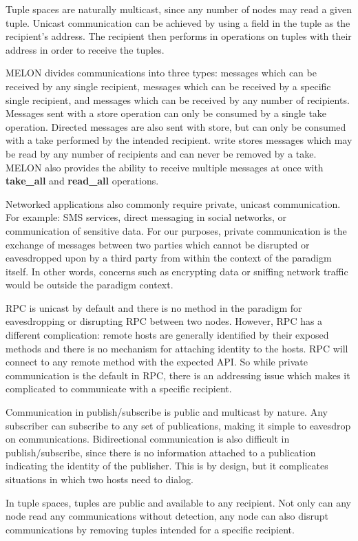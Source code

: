 \documentclass[lnicst]{svmultln}
\begin{document}
Tuple spaces are naturally multicast, since any number of nodes may read a given tuple. Unicast communication can be achieved by using a field in the tuple as the recipient’s address. The recipient then performs in operations on tuples with their address in order to receive the tuples.

MELON divides communications into three types: messages which can be received by any single recipient, messages which can be received by a specific single recipient, and messages which can be received by any number of recipients. Messages sent with a store operation can only be consumed by a single take operation. Directed messages are also sent with store, but can only be consumed with a take performed by the intended recipient. write stores messages which may be read by any number of recipients and can never be removed by a take. MELON also provides the ability to receive multiple messages at once with \textbf{take\_all} and \textbf{read\_all} operations.
    
Networked applications also commonly require private, unicast communication. For example: SMS services, direct messaging in social networks, or communication of sensitive data. For our purposes, private communication is the exchange of messages between two parties which cannot be disrupted or eavesdropped upon by a third party from within the context of the paradigm itself. In other words, concerns such as encrypting data or sniffing network traffic would be outside the paradigm context.

RPC is unicast by default and there is no method in the paradigm for eavesdropping or disrupting RPC between two nodes. However, RPC has a different complication: remote hosts are generally identified by their exposed methods and there is no mechanism for attaching identity to the hosts. RPC will connect to any remote method with the expected API. So while private communication is the default in RPC, there is an addressing issue which makes it complicated to communicate with a specific recipient.

Communication in publish/subscribe is public and multicast by nature. Any subscriber can subscribe to any set of publications, making it simple to eavesdrop on communications. Bidirectional communication is also difficult in publish/subscribe, since there is no information attached to a publication indicating the identity of the publisher. This is by design, but it complicates situations in which two hosts need to dialog.

In tuple spaces, tuples are public and available to any recipient. Not only can any node read any communications without detection, any node can also disrupt communications by removing tuples intended for a specific recipient.
\end{document}
